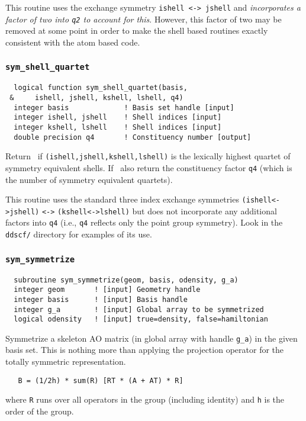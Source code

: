 This routine uses the exchange symmetry \verb+ishell <-> jshell+ and
{\em incorporates a factor of two into \verb+q2+ to account for this}.
However, this factor of two may be removed at some point in order to
make the shell based routines exactly consistent with the atom based
code.

\subsubsection{{\tt sym\_shell\_quartet}}
\begin{verbatim}
  logical function sym_shell_quartet(basis,
 &     ishell, jshell, kshell, lshell, q4)
  integer basis             ! Basis set handle [input]
  integer ishell, jshell    ! Shell indices [input]
  integer kshell, lshell    ! Shell indices [input]
  double precision q4       ! Constituency number [output]
\end{verbatim}
Return \TRUE\ if \verb+(ishell,jshell,kshell,lshell)+ is the lexically highest
quartet of symmetry equivalent shells. If \TRUE\ also return the
constituency factor \verb+q4+ (which is the number of symmetry
equivalent quartets).

This routine uses the standard three index exchange symmetries
\verb+(ishell<->jshell)+ \verb+<->+ \verb+(kshell<->lshell)+ but does
not incorporate any additional factors into \verb+q4+ (i.e., \verb+q4+
reflects only the point group symmetry).  Look in the \verb+ddscf/+
directory for examples of its use.

\subsubsection{{\tt sym\_symmetrize}}
\begin{verbatim}
  subroutine sym_symmetrize(geom, basis, odensity, g_a)
  integer geom       ! [input] Geometry handle
  integer basis      ! [input] Basis handle
  integer g_a        ! [input] Global array to be symmetrized
  logical odensity   ! [input] true=density, false=hamiltonian
\end{verbatim}
Symmetrize a skeleton AO matrix (in global array with handle
\verb+g_a+) in the given basis set.  This is nothing more than
applying the projection operator for the totally symmetric
representation.
\begin{verbatim}
   B = (1/2h) * sum(R) [RT * (A + AT) * R]
\end{verbatim}
where \verb+R+ runs over all operators in the group (including
identity) and \verb+h+ is the order of the group.

